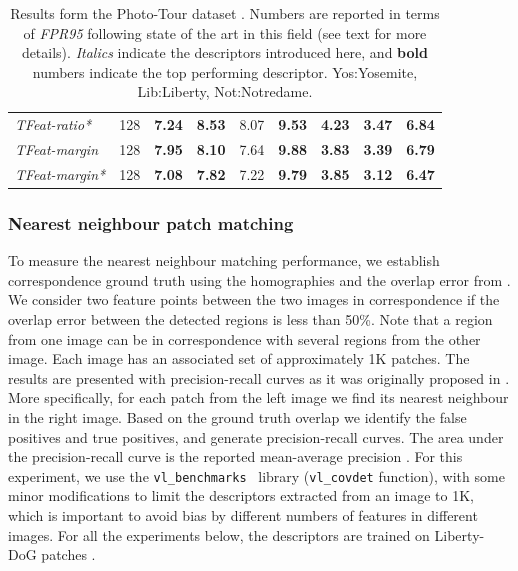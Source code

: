 \begin{table}[ht]
\begin{tabular}{lcccccccc}
 {\em TFeat-ratio*} &  128 & \bf 7.24 & \bf 8.53 &  8.07 & \bf 9.53  & \bf 4.23 & \bf 3.47 & \bf 6.84  \\
 {\em TFeat-margin} &  128 & \bf 7.95 & \bf 8.10 &  7.64 &  \bf 9.88 & \bf 3.83  & \bf 3.39  & \bf 6.79 \\ 
 {\em TFeat-margin*} &  128 & \bf 7.08 & \bf 7.82 & 7.22 &  \bf 9.79  &  \bf 3.85  &  \bf 3.12 & \bf 6.47 \\ 
  \bottomrule
\end{tabular}
  \caption {Results form the Photo-Tour dataset \cite{BHW10}. Numbers
    are reported in terms of {\em FPR95} following state of the art 
    in this field (see text for more details). {\em Italics} indicate
    the descriptors introduced here, and {\bf bold} numbers indicate
    the top performing descriptor. Yos:Yosemite, Lib:Liberty,
    Not:Notredame.}
\label{tab:benchmark_brown} 
\end{table}

\subsubsection{Nearest neighbour patch matching}

To measure the nearest neighbour matching performance, we establish
correspondence ground truth using the homographies and the overlap
error from \cite{schmid2003performance}.  We consider two feature
points between the two images in correspondence if the overlap error
between the detected regions is less than 50\%.  Note that a region
from one image can be in correspondence with several regions from the
other image.  Each image has an associated set of approximately 1K
patches.  The results are presented with precision-recall curves as it
was originally proposed in \cite{schmid2003performance}.  More
specifically, for each patch from the left image we find its nearest
neighbour in the right image.  Based on the ground truth overlap we
identify the false positives and true positives, and generate
precision-recall curves. The area under the precision-recall curve is
the reported mean-average precision
\cite{WHB09,ZagoruykoCVPR2015,DBLP:journals/corr/DongS14}.  For this
experiment, we use the \texttt{vl\_benchmarks}~\cite{vedaldi08vlfeat} library
(\texttt{vl\_covdet} function), with some minor modifications to limit
the descriptors extracted from an image to 1K, which is important to
avoid bias by different numbers of features in different images. For
all the experiments below, the descriptors are trained on Liberty-DoG
patches \cite{BHW10}.

